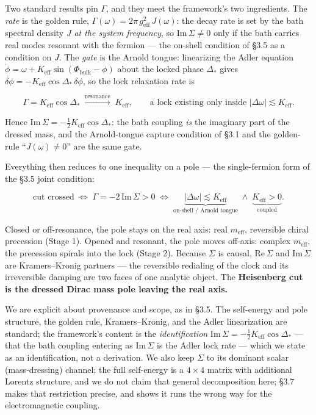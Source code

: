 \documentclass[
]{article}
\begin{document}
Two standard results pin \(\Gamma\), and they meet the framework's two
ingredients. The \emph{rate} is the golden rule,
\(\Gamma(\omega) = 2\pi\,g_{\text{eff}}^2\,J(\omega)\): the decay rate
is set by the bath spectral density \(J\) \emph{at the system
frequency}, so \(\mathrm{Im}\,\Sigma\neq 0\) only if the bath carries
real modes resonant with the fermion --- the on-shell condition of §3.5
as a condition on \(J\). The \emph{gate} is the Arnold tongue:
linearizing the Adler equation
\(\dot\phi=\omega+K_{\text{eff}}\sin(\Phi_{\text{bulk}}-\phi)\) about
the locked phase \(\Delta_*\) gives
\(\dot{\delta\phi}=-K_{\text{eff}}\cos\Delta_*\,\delta\phi\), so the
lock relaxation rate is

\[\Gamma = K_{\text{eff}}\cos\Delta_* \;\xrightarrow{\text{resonance}}\; K_{\text{eff}}, \qquad \text{a lock existing only inside } |\Delta\omega|\lesssim K_{\text{eff}}.\]

Hence \(\mathrm{Im}\,\Sigma = -\tfrac12 K_{\text{eff}}\cos\Delta_*\):
the bath coupling \emph{is} the imaginary part of the dressed mass, and
the Arnold-tongue capture condition of §3.1 and the golden-rule
``\(J(\omega)\neq 0\)'' are the same gate.

Everything then reduces to one inequality on a pole --- the
single-fermion form of the §3.5 joint condition:

\[\text{cut crossed} \;\Longleftrightarrow\; \Gamma = -2\,\mathrm{Im}\,\Sigma > 0 \;\Longleftrightarrow\; \underbrace{|\Delta\omega| \lesssim K_{\text{eff}}}_{\text{on-shell / Arnold tongue}} \;\wedge\; \underbrace{K_{\text{eff}} > 0}_{\text{coupled}}.\]

Closed or off-resonance, the pole stays on the real axis: real
\(m_{\text{eff}}\), reversible chiral precession (Stage 1). Opened and
resonant, the pole moves off-axis: complex \(m_{\text{eff}}\), the
precession spirals into the lock (Stage 2). Because \(\Sigma\) is
causal, \(\mathrm{Re}\,\Sigma\) and \(\mathrm{Im}\,\Sigma\) are
Kramers--Kronig partners --- the reversible redialing of the clock and
its irreversible damping are two faces of one analytic object. The
\textbf{Heisenberg cut is the dressed Dirac mass pole leaving the real
axis.}

We are explicit about provenance and scope, as in §3.5. The self-energy
and pole structure, the golden rule, Kramers--Kronig, and the Adler
linearization are standard; the framework's content is the
\emph{identification}
\(\mathrm{Im}\,\Sigma = -\tfrac12 K_{\text{eff}}\cos\Delta_*\) --- that
the bath coupling entering as \(\mathrm{Im}\,\Sigma\) is the Adler lock
rate --- which we state as an identification, not a derivation. We also
keep \(\Sigma\) to its dominant scalar (mass-dressing) channel; the full
self-energy is a \(4\times4\) matrix with additional Lorentz structure,
and we do not claim that general decomposition here; §3.7 makes that
restriction precise, and shows it runs the wrong way for the
electromagnetic coupling.
\end{document}
